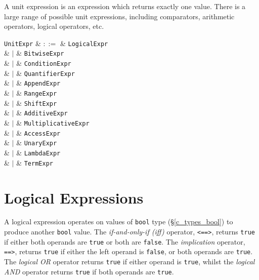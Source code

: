 A unit expression is an expression which returns exactly one value.  There is a large range of possible unit expressions, including comparators, arithmetic operators, logical operators, etc.

\begin{syntax}
  \verb+UnitExpr+ & $::=$ & \verb+LogicalExpr+\\
                  &  $|$  & \verb+BitwiseExpr+\\
                  &  $|$  & \verb+ConditionExpr+\\
                  &  $|$  & \verb+QuantifierExpr+\\
                  &  $|$  & \verb+AppendExpr+\\
                  &  $|$  & \verb+RangeExpr+\\
                  &  $|$  & \verb+ShiftExpr+\\
                  &  $|$  & \verb+AdditiveExpr+\\
                  &  $|$  & \verb+MultiplicativeExpr+\\
                  &  $|$  & \verb+AccessExpr+\\
                  &  $|$  & \verb+UnaryExpr+\\
                  &  $|$  & \verb+LambdaExpr+\\
                  &  $|$  & \verb+TermExpr+\\
                
\end{syntax}


\section{Logical Expressions}
\label{c_expr_logical}

A logical expression operates on values of \lstinline{bool} type (\S\ref{c_types_bool}) to produce another \lstinline{bool} value.  The {\em if-and-only-if (iff)} operator, \lstinline{<==>}, returns \lstinline{true} if either both operands are \lstinline{true} or both are \lstinline{false}.  The {\em implication} operator, \lstinline{==>}, returns \lstinline{true} if either the left operand is \lstinline{false}, or both operands are \lstinline{true}.  The {\em logical OR} operator returns \lstinline{true} if either operand is \lstinline{true}, whilst the {\em logical AND} operator returns \lstinline{true} if both operands are \lstinline{true}.

